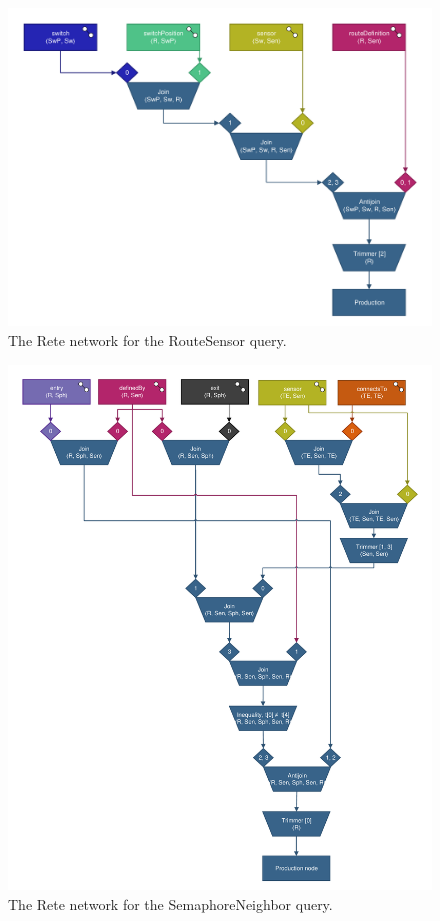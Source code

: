 \begin{figure}[htb]
\begin{center}
\includegraphics[scale=0.5]{figures/rete-routesensor-layout.pdf}
\caption{The Rete network for the \textsf{RouteSensor} query.}
\label{fig:rete-routesensor-layout}
\end{center}
\end{figure}

\begin{figure}[htb]
\begin{center}
\includegraphics[scale=0.5]{figures/rete-semaphoreneighbor-layout.pdf}
\caption{The Rete network for the \textsf{SemaphoreNeighbor} query.}
\label{fig:rete-semaphoreneighbor-layout}
\end{center}
\end{figure}
